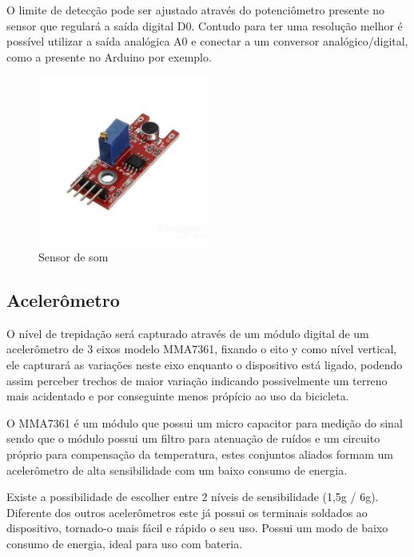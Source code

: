 \documentclass[final,12pt, times, 5p, twocolumn]{elsarticle}
\begin{document}
O limite de detecção pode ser ajustado através do potenciômetro presente no sensor que regulará a saída digital D0. Contudo para ter uma resolução melhor é possível utilizar a saída analógica A0 e conectar a um conversor analógico/digital, como a presente no Arduino por exemplo.

\begin{figure}[ht!]
\centering
\includegraphics[width=0.5\textwidth]{som.jpg}
\caption{\label{fig:som}Sensor de som}
\end{figure}

\subsection{Acelerômetro}

O nível de trepidação será capturado através de um módulo digital de um acelerômetro de 3 eixos modelo MMA7361, fixando o eito y como nível vertical, ele capturará as variações neste eixo enquanto o dispositivo está ligado, podendo assim perceber trechos de maior variação indicando possivelmente um terreno mais acidentado e por conseguinte menos própício ao uso da bicicleta.

O MMA7361 é um módulo que possui um micro capacitor para medição do sinal sendo que o módulo possui um filtro para atenuação de ruídos e um circuito próprio para compensação da temperatura, estes conjuntos aliados formam um acelerômetro de alta sensibilidade com um baixo consumo de energia.

Existe a possibilidade de escolher entre 2 níveis de sensibilidade (1,5g / 6g). Diferente dos outros acelerômetros este já possui os terminais soldados ao dispositivo, tornado-o mais fácil e rápido o seu uso. Possui um modo de baixo consumo de energia, ideal para uso com bateria.
\end{document}
